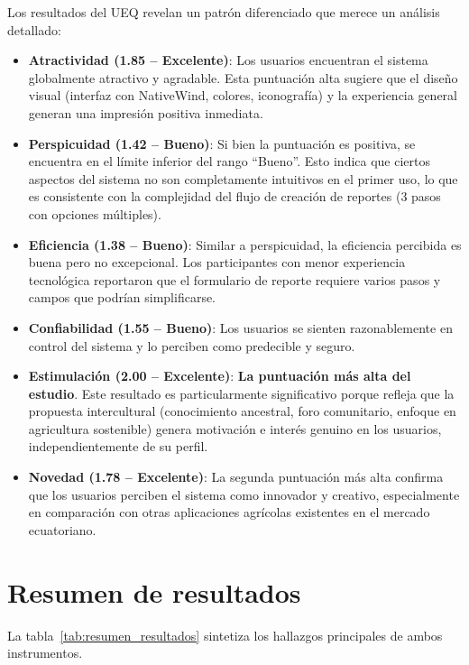 \documentclass[a4paper,12pt]{report}
\begin{document}
Los resultados del UEQ revelan un patrón diferenciado que merece un análisis detallado:

\begin{itemize}
    \item \textbf{Atractividad (1.85 -- Excelente)}: Los usuarios encuentran el sistema globalmente atractivo y agradable. Esta puntuación alta sugiere que el diseño visual (interfaz con NativeWind, colores, iconografía) y la experiencia general generan una impresión positiva inmediata.
    \item \textbf{Perspicuidad (1.42 -- Bueno)}: Si bien la puntuación es positiva, se encuentra en el límite inferior del rango ``Bueno''. Esto indica que ciertos aspectos del sistema no son completamente intuitivos en el primer uso, lo que es consistente con la complejidad del flujo de creación de reportes (3 pasos con opciones múltiples).
    \item \textbf{Eficiencia (1.38 -- Bueno)}: Similar a perspicuidad, la eficiencia percibida es buena pero no excepcional. Los participantes con menor experiencia tecnológica reportaron que el formulario de reporte requiere varios pasos y campos que podrían simplificarse.
    \item \textbf{Confiabilidad (1.55 -- Bueno)}: Los usuarios se sienten razonablemente en control del sistema y lo perciben como predecible y seguro.
    \item \textbf{Estimulación (2.00 -- Excelente)}: \textbf{La puntuación más alta del estudio}. Este resultado es particularmente significativo porque refleja que la propuesta intercultural (conocimiento ancestral, foro comunitario, enfoque en agricultura sostenible) genera motivación e interés genuino en los usuarios, independientemente de su perfil.
    \item \textbf{Novedad (1.78 -- Excelente)}: La segunda puntuación más alta confirma que los usuarios perciben el sistema como innovador y creativo, especialmente en comparación con otras aplicaciones agrícolas existentes en el mercado ecuatoriano.
\end{itemize}

\section{Resumen de resultados}

La tabla~\ref{tab:resumen_resultados} sintetiza los hallazgos principales de ambos instrumentos.
\end{document}
